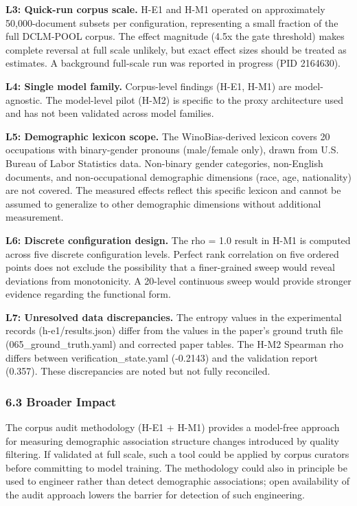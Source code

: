 \textbf{L3: Quick-run corpus scale.} H-E1 and H-M1 operated on approximately 50,000-document subsets per configuration, representing a small fraction of the full DCLM-POOL corpus. The effect magnitude (4.5x the gate threshold) makes complete reversal at full scale unlikely, but exact effect sizes should be treated as estimates. A background full-scale run was reported in progress (PID 2164630).

\textbf{L4: Single model family.} Corpus-level findings (H-E1, H-M1) are model-agnostic. The model-level pilot (H-M2) is specific to the proxy architecture used and has not been validated across model families.

\textbf{L5: Demographic lexicon scope.} The WinoBias-derived lexicon covers 20 occupations with binary-gender pronouns (male/female only), drawn from U.S. Bureau of Labor Statistics data. Non-binary gender categories, non-English documents, and non-occupational demographic dimensions (race, age, nationality) are not covered. The measured effects reflect this specific lexicon and cannot be assumed to generalize to other demographic dimensions without additional measurement.

\textbf{L6: Discrete configuration design.} The rho = 1.0 result in H-M1 is computed across five discrete configuration levels. Perfect rank correlation on five ordered points does not exclude the possibility that a finer-grained sweep would reveal deviations from monotonicity. A 20-level continuous sweep would provide stronger evidence regarding the functional form.

\textbf{L7: Unresolved data discrepancies.} The entropy values in the experimental records (h-e1/results.json) differ from the values in the paper's ground truth file (065\_ground\_truth.yaml) and corrected paper tables. The H-M2 Spearman rho differs between verification\_state.yaml (-0.2143) and the validation report (0.357). These discrepancies are noted but not fully reconciled.

\subsubsection{6.3 Broader Impact}

The corpus audit methodology (H-E1 + H-M1) provides a model-free approach for measuring demographic association structure changes introduced by quality filtering. If validated at full scale, such a tool could be applied by corpus curators before committing to model training. The methodology could also in principle be used to engineer rather than detect demographic associations; open availability of the audit approach lowers the barrier for detection of such engineering.


